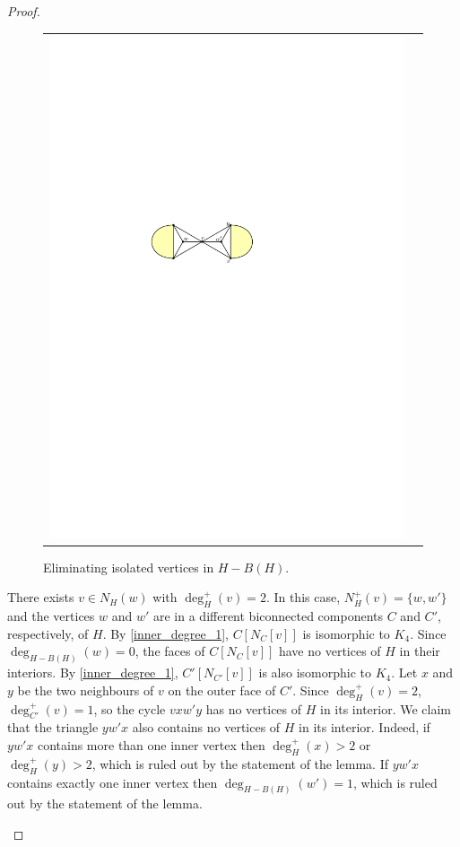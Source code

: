 \documentclass[12pt]{article}
\theoremstyle{definition}
\begin{document}
\begin{proof}
\begin{figure}[htpb]
\begin{tabular}{cc}
      \includegraphics[page=4]{figs/isolated}
    \end{tabular}
    \caption{Eliminating isolated vertices in $H-B(H)$.}
    \label{isolated_fig}
  \end{figure}
  \begin{compactenum}[(a)]
    \item There exists $v\in N_H(w)$ with $\deg^+_H(v)=2$. In this case, $N^+_H(v)=\{w,w'\}$ and the vertices $w$ and $w'$ are in a different biconnected components $C$ and $C'$, respectively, of $H$. By \cref{inner_degree_1}, $C[N_C[v]]$ is isomorphic to $K_4$. Since $\deg_{H-B(H)}(w)=0$, the faces of $C[N_C[v]]$ have no vertices of $H$ in their interiors.   By \cref{inner_degree_1}, $C'[N_{C'}[v]]$ is also isomorphic to $K_4$.  Let $x$ and $y$ be the two neighbours of $v$ on the outer face of $C'$. Since $\deg^+_H(v)=2$, $\deg_{C'}^+(v)=1$, so the cycle $vxw'y$ has no vertices of $H$ in its interior.
    We claim that the triangle $yw'x$ also contains no vertices of $H$ in its interior. Indeed, if $yw'x$ contains more than one inner vertex then $\deg^+_H(x)>2$ or $\deg^+_H(y)>2$, which is ruled out by the statement of the lemma.  If $yw'x$ contains exactly one inner vertex then $\deg_{H-B(H)}(w')=1$, which is ruled out by the statement of the lemma.


\end{compactenum}
\end{proof}
\end{document}
